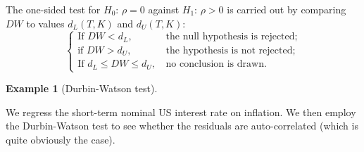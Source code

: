 \documentclass[
  12pt,
]{book}
\theoremstyle{definition}
\theoremstyle{definition}
\newtheorem{example}{Example}[chapter]
\theoremstyle{definition}
\theoremstyle{definition}
\theoremstyle{remark}
\begin{document}
The one-sided test for \(H_0\): \(\rho=0\) against \(H_1\): \(\rho>0\) is carried out by comparing \(DW\) to values \(d_L(T, K)\) and \(d_U(T, K)\):
\[
\left\{
\begin{array}{ll}
\mbox{If $DW < d_L$,}&\mbox{ the null hypothesis is rejected;}\\
\mbox{if $DW > d_U$,}&\mbox{ the hypothesis is not rejected;}\\
\mbox{If $d_L \le DW \le d_U$,} &\mbox{ no conclusion is drawn.}
\end{array}
\right.
\]

\begin{example}[Durbin-Watson test]
\protect\hypertarget{exm:DurbinWats}{}\label{exm:DurbinWats}

We regress the short-term nominal US interest rate on inflation. We then employ the Durbin-Watson test to see whether the residuals are auto-correlated (which is quite obviously the case).


\end{example}
\end{document}
